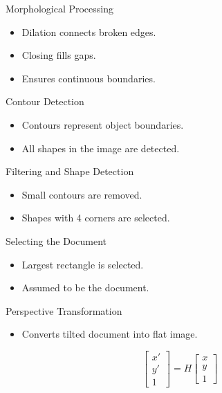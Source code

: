\documentclass{beamer}
\begin{document}
\begin{frame}{Morphological Processing}
\begin{itemize}
\item Dilation connects broken edges.
\item Closing fills gaps.
\item Ensures continuous boundaries.
\end{itemize}
\end{frame}

\begin{frame}{Contour Detection}
\begin{itemize}
\item Contours represent object boundaries.
\item All shapes in the image are detected.
\end{itemize}
\end{frame}

\begin{frame}{Filtering and Shape Detection}
\begin{itemize}
\item Small contours are removed.
\item Shapes with 4 corners are selected.
\end{itemize}
\end{frame}

\begin{frame}{Selecting the Document}
\begin{itemize}
\item Largest rectangle is selected.
\item Assumed to be the document.
\end{itemize}
\end{frame}

\begin{frame}{Perspective Transformation}
\begin{itemize}
\item Converts tilted document into flat image.
\end{itemize}

\[
\begin{bmatrix}x'\\y'\\1\end{bmatrix}
=
H
\begin{bmatrix}x\\y\\1\end{bmatrix}
\]
\end{frame}
\end{document}
